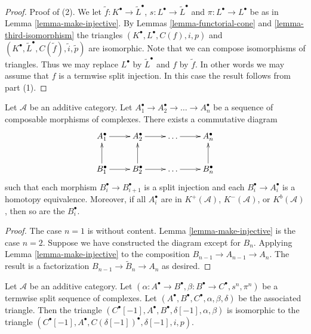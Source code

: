 \begin{proof}
\medskip\noindent
Proof of (2). We let $\tilde f : K^\bullet \to \tilde L^\bullet$,
$s : L^\bullet \to \tilde L^\bullet$
and $\pi : L^\bullet \to L^\bullet$ be as in
Lemma \ref{lemma-make-injective}. By
Lemmas \ref{lemma-functorial-cone} and \ref{lemma-third-isomorphism}
the triangles $(K^\bullet, L^\bullet, C(f), i, p)$ and
$(K^\bullet, \tilde L^\bullet, C(\tilde f), \tilde i, \tilde p)$
are isomorphic. Note that we can compose isomorphisms of
triangles. Thus we may replace $L^\bullet$ by
$\tilde L^\bullet$ and $f$ by $\tilde f$. In other words
we may assume that $f$ is a termwise split injection.
In this case the result follows from part (1).
\end{proof}


\begin{lemma}
\label{lemma-sequence-maps-split}
Let $\mathcal{A}$ be an additive category.
Let $A_1^\bullet \to A_2^\bullet \to \ldots \to A_n^\bullet$
be a sequence of composable morphisms of complexes.
There exists a commutative diagram
$$
\xymatrix{
A_1^\bullet \ar[r] &
A_2^\bullet \ar[r] &
\ldots \ar[r] &
A_n^\bullet \\
B_1^\bullet \ar[r] \ar[u] &
B_2^\bullet \ar[r] \ar[u] &
\ldots \ar[r] &
B_n^\bullet \ar[u]
}
$$
such that each morphism $B_i^\bullet \to B_{i + 1}^\bullet$
is a split injection and each $B_i^\bullet \to A_i^\bullet$
is a homotopy equivalence. Moreover, if all $A_i^\bullet$ are in
$K^{+}(\mathcal{A})$, $K^{-}(\mathcal{A})$, or $K^b(\mathcal{A})$,
then so are the $B_i^\bullet$.
\end{lemma}

\begin{proof}
The case $n = 1$ is without content.
Lemma \ref{lemma-make-injective} is the case $n = 2$.
Suppose we have constructed the diagram
except for $B_n$. Applying Lemma \ref{lemma-make-injective} to
the composition $B_{n - 1} \to A_{n - 1} \to A_n$.
The result is a factorization $B_{n - 1} \to \tilde B_n \to A_n$
as desired.
\end{proof}


\begin{lemma}
\label{lemma-rotate-triangle}
Let $\mathcal{A}$ be an additive category. Let
$(\alpha : A^\bullet \to B^\bullet, \beta : B^\bullet \to C^\bullet, s^n,
\pi^n)$ be a termwise split sequence of complexes.
Let $(A^\bullet, B^\bullet, C^\bullet, \alpha, \beta, \delta)$
be the associated triangle.
Then the triangle
$(C^\bullet[-1], A^\bullet, B^\bullet, \delta[-1], \alpha, \beta)$
is isomorphic to the triangle
$(C^\bullet[-1], A^\bullet, C(\delta[-1])^\bullet, \delta[-1], i, p)$.
\end{lemma}

